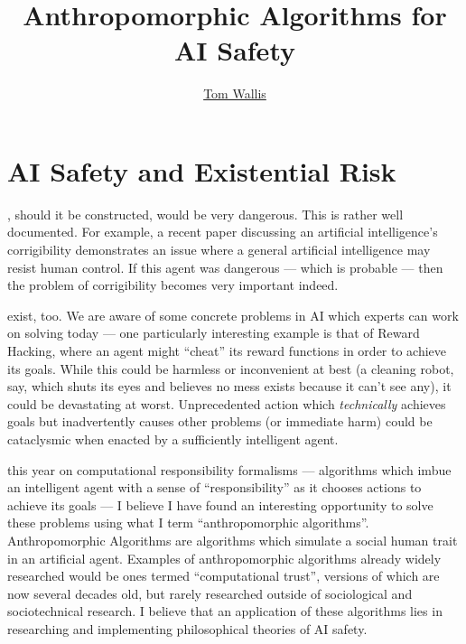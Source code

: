 
\title{Anthropomorphic Algorithms for AI Safety}
\author[Tom Wallis]{\href{http://tom.coffee}{Tom Wallis}}
\date{}



\maketitle

\section{AI Safety and Existential Risk}

, should it be constructed, would be very dangerous. This is rather well documented. For example, a recent paper discussing an artificial intelligence's corrigibility\cite{corrigability} demonstrates an issue where a general artificial intelligence may resist human control. If this agent was dangerous --- which is probable --- then the problem of corrigibility becomes very important indeed.\par

 exist, too. We are aware of some concrete problems in AI which experts can work on solving today\cite{concrete_problems} --- one particularly interesting example is that of Reward Hacking, where an agent might ``cheat'' its reward functions in order to achieve its goals. While this could be harmless or inconvenient at best (a cleaning robot, say, which shuts its eyes and believes no mess exists because it can't see any), it could be devastating at worst. Unprecedented action which \emph{technically} achieves goals but inadvertently causes other problems (or immediate harm) could be cataclysmic when enacted by a sufficiently intelligent agent.\par

 this year on computational responsibility formalisms --- algorithms which imbue an intelligent agent with a sense of ``responsibility'' as it chooses actions to achieve its goals --- I believe I have found an interesting opportunity to solve these problems using what I term ``anthropomorphic algorithms''. Anthropomorphic Algorithms are algorithms which simulate a social human trait in an artificial agent. Examples of anthropomorphic algorithms already widely researched would be ones termed ``computational trust'', versions of which are now several decades old\cite{marsh1994}, but rarely researched outside of sociological and sociotechnical research. I believe that an application of these algorithms lies in researching and implementing philosophical theories of AI safety. \par

